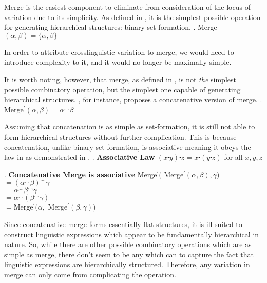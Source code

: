 \documentclass[MilwayThesis]{subfiles}
\begin{document}
Merge is the easiest component to eliminate from consideration of the locus of variation due to its simplicity.
As defined in \Next, it is the simplest possible operation for generating hierarchical structures: binary set formation.
\ex. Merge$(\alpha, \beta) = \{ \alpha, \beta\}$

In order to attribute crosslinguistic variation to merge, we would need to introduce complexity to it, and it would no longer be maximally simple.

It is worth noting, however, that merge, as defined in \Last, is not \textit{the} simplest possible combinatory operation, but the simplest one capable of generating hierarchical structures.
\textcite{hornstein2009theory}, for instance, proposes a concatenative version of merge.
\ex. Merge$^\prime(\alpha, \beta) = \alpha^\frown\beta$

Assuming that concatenation is as simple as set-formation, it is still not able to form hierarchical structures without further complication.
This is because concatenation, unlike binary set-formation, is associative meaning it obeys the law in \Next as demonstrated in \NNext.
\ex. \textbf{Associative Law}
$(x \centerdot y) \centerdot z = x \centerdot (y \centerdot z)$ for all $x,y,z$

\ex. \textbf{Concatenative Merge is associative}
Merge$^\prime($ Merge$^\prime(\alpha, \beta), \gamma)$\\
$= (\alpha^\frown\beta)^\frown\gamma$\\
$= \alpha^\frown\beta^\frown\gamma$\\
$= \alpha^\frown(\beta^\frown\gamma)$\\
$= $Merge$^\prime(\alpha, $ Merge$^\prime(\beta, \gamma))$

Since concatenative merge forms essentially flat structures, it is ill-suited to construct linguistic expressions which appear to be fundamentally hierarchical in nature.
So, while there are other possible combinatory operations which are as simple as merge, there don't seem to be any which can to capture the fact that linguistic expressions are hierarchically structured.
Therefore, any variation in merge can only come from complicating the operation.
\end{document}
